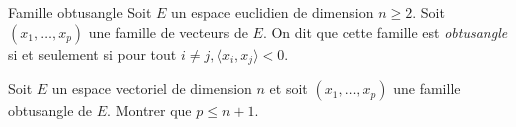 \begin{defi}{Famille obtusangle}
    Soit $E$ un espace euclidien de dimension $n \geqslant 2$. Soit $(x_1, \dots, x_p)$ une famille de vecteurs de $E$. On dit que cette famille est \emph{obtusangle} si et seulement si pour tout $i \not= j, \langle x_i, x_j \rangle < 0$. 
\end{defi}

\begin{exercice0}
    Soit $E$ un espace vectoriel de dimension $n$ et soit $(x_1, \dots, x_p)$ une famille obtusangle de $E$. Montrer que $p \leqslant n + 1$. 
\end{exercice0}
